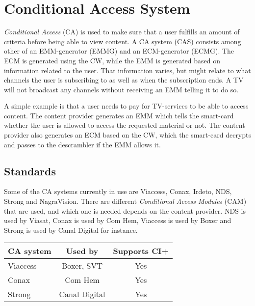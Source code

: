 \section{Conditional Access System} \label{sec:CAS}
\emph{Conditional Access} (CA) is used to make sure that a user fulfills an 
amount of criteria before being able to view content. A CA system (CAS) consists 
among other of an EMM-generator (EMMG) and an ECM-generator (ECMG). %
The ECM is generated using the CW, while the EMM is generated based on 
information related to the user. That information varies, but might relate to 
what channels the user is subscribing to as well as when the subscription ends. 
A TV will not broadcast any channels without receiving an EMM telling it to do 
so.

A simple example is that a user needs to pay for TV-services to be able to access
content. The content provider generates an EMM which tells the smart-card whether
the user is allowed to access the requested material or not. The content provider
also generates an ECM based on the CW, which the smart-card decrypts and passes 
to the descrambler if the EMM allows it.

\subsection{Standards}
Some of the CA systems currently in use are Viaccess, Conax, Irdeto, NDS, Strong 
and NagraVision. There are different \emph{Conditional Access Module}s (CAM) 
that are used, and which one is needed depends on the content provider. NDS is 
used by Viasat, Conax is used by Com Hem, Viaccess is used by Boxer and Strong 
is used by Canal Digital for instance.

\begin{longtable}{| l | c | c |}
  \hline
  CA system & Used by & Supports CI+ \\ \hline
  
  Viaccess & Boxer, SVT & Yes \\ \hline
  Conax & Com Hem & Yes \\ \hline
  Strong & Canal Digital & Yes \\ \hline
\end{longtable}


